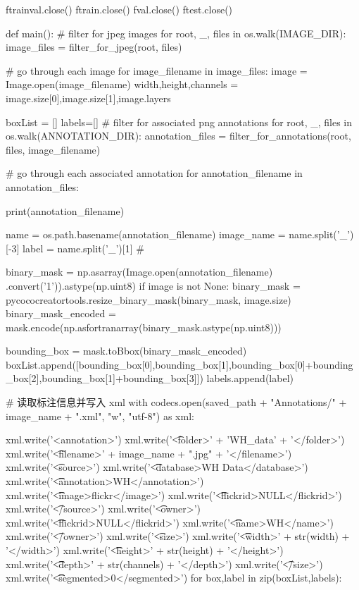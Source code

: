 \begin{python}
    ftrainval.close()  
    ftrain.close()  
    fval.close()  
    ftest.close()

def main():
    # filter for jpeg images
    for root, _, files in os.walk(IMAGE_DIR):
        image_files = filter_for_jpeg(root, files)

        # go through each image
        for image_filename in image_files:
            image = Image.open(image_filename)
            width,height,channels = image.size[0],image.size[1],image.layers

            boxList = []
            labels=[]
            # filter for associated png annotations
            for root, _, files in os.walk(ANNOTATION_DIR):
                annotation_files = filter_for_annotations(root, files, image_filename)
 
                # go through each associated annotation
                for annotation_filename in annotation_files:

                    print(annotation_filename)

                    name = os.path.basename(annotation_filename)
                    image_name = name.split('_')[-3]
                    label = name.split('_')[1] # 
                    
                    binary_mask = np.asarray(Image.open(annotation_filename)
                        .convert('1')).astype(np.uint8)
                    if image is not None:
                        binary_mask = pycococreatortools.resize_binary_mask(binary_mask, image.size)
                    binary_mask_encoded = mask.encode(np.asfortranarray(binary_mask.astype(np.uint8)))

                    bounding_box = mask.toBbox(binary_mask_encoded)
                    boxList.append([bounding_box[0],bounding_box[1],bounding_box[0]+bounding_box[2],bounding_box[1]+bounding_box[3]])
                    labels.append(label)

            # 读取标注信息并写入 xml
            with codecs.open(saved_path + "Annotations/" + image_name + ".xml", "w", "utf-8") as xml:
        
                xml.write('<annotation>\n')
                xml.write('\t<folder>' + 'WH_data' + '</folder>\n')
                xml.write('\t<filename>' + image_name + ".jpg" + '</filename>\n')
                xml.write('\t<source>\n')
                xml.write('\t\t<database>WH Data</database>\n')
                xml.write('\t\t<annotation>WH</annotation>\n')
                xml.write('\t\t<image>flickr</image>\n')
                xml.write('\t\t<flickrid>NULL</flickrid>\n')
                xml.write('\t</source>\n')
                xml.write('\t<owner>\n')
                xml.write('\t\t<flickrid>NULL</flickrid>\n')
                xml.write('\t\t<name>WH</name>\n')
                xml.write('\t</owner>\n')
                xml.write('\t<size>\n')
                xml.write('\t\t<width>' + str(width) + '</width>\n')
                xml.write('\t\t<height>' + str(height) + '</height>\n')
                xml.write('\t\t<depth>' + str(channels) + '</depth>\n')
                xml.write('\t</size>\n')
                xml.write('\t\t<segmented>0</segmented>\n')
                for box,label in zip(boxList,labels):


\end{python}
